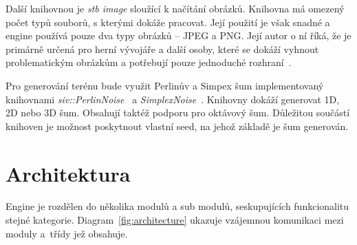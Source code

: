 \documentclass[thesis=M,czech]{FITthesis}[2019/12/23]
\begin{document}
Další knihovnou je \textit{stb image} sloužící k načítání obrázků. Knihovna má omezený počet typů souborů, s kterými dokáže pracovat. Její použití je však snadné a engine používá pouze dva typy obrázků – JPEG a PNG. Její autor o ní říká, že je primárně určená pro herní vývojáře a další osoby, které se dokáží vyhnout problematickým obrázkům a potřebují pouze jednoduché rozhraní~\cite{stb_image}.

Pro generování terénu bude využit Perlinův a Simpex šum implementovaný knihovnami  \textit{siv::PerlinNoise}~\cite{perlin} a \textit{SimplexNoise}~\cite{simplex_lib}. Knihovny dokáží generovat 1D, 2D nebo 3D šum. Obsahují taktéž podporu pro oktávový šum. Důležitou součástí knihoven je možnost poskytnout vlastní seed, na jehož základě je šum generován.


\chapter{Architektura}

Engine je rozdělen do několika modulů a sub modulů, seskupujících funkcionalitu stejné kategorie. Diagram~\ref{fig:architecture} ukazuje vzájemnou komunikaci mezi moduly a~třídy jež obsahuje.
\end{document}
